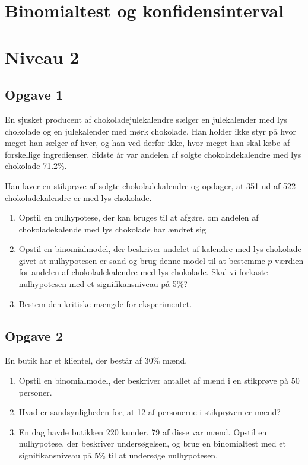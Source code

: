 \newpage

\section*{Binomialtest og konfidensinterval}

\section*{Niveau 2}

\subsection*{Opgave 1}
En sjusket producent af chokoladejulekalendre sælger en julekalender med lys chokolade og en julekalender med mørk chokolade. Han holder ikke styr på hvor meget han sælger af hver, og han ved derfor
ikke, hvor meget han skal købe af forskellige ingredienser. Sidste år var andelen af solgte chokoladekalendre med lys chokolade 71.2$\%$. 

Han laver en stikprøve af solgte chokoladekalendre og opdager, at 351 ud af 522 chokoladekalendre er med lys chokolade.
\begin{enumerate}[label=\roman*)]
	\item Opstil en nulhypotese, der kan bruges til at afgøre, om andelen af chokoladekalende med lys chokolade har ændret sig
	\item Opstil en binomialmodel, der beskriver andelet af kalendre med lys chokolade givet at nulhypotesen er sand og brug denne model til at bestemme $p$-værdien for andelen af chokoladekalendre med lys chokolade. Skal vi forkaste nulhypotesen med et signifikansniveau på 5$\%$?
	\item Bestem den kritiske mængde for eksperimentet.
\end{enumerate} 

\subsection*{Opgave 2}
En butik har et klientel, der består af $30\%$ mænd. 
\begin{enumerate}[label=\roman*)]
\item Opstil en binomialmodel, der beskriver antallet af mænd i en stikprøve på $50$ personer.
\item Hvad er sandsynligheden for, at 12 af personerne i stikprøven er mænd?
\item En dag havde butikken $220$ kunder. 79 af disse var mænd. Opstil en nulhypotese, der beskriver undersøgelsen, og brug en binomialtest med et signifikansniveau på $5\%$ til at undersøge nulhypotesen. 
\end{enumerate}


